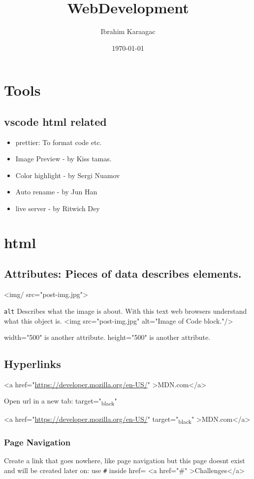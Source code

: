 \documentclass[11pt]{article}
\author{Ibrahim Karaagac}
\date{\today}
\title{WebDevelopment}
\begin{document}
\maketitle
\tableofcontents

\section{Tools}
\label{sec:org4ec48de}
\subsection{vscode html related}
\label{sec:org60915c2}
\begin{itemize}
\item prettier: To format code etc.
\item Image Preview - by Kiss tamas.
\item Color highlight - by Sergi Nuamov
\item Auto rename - by Jun Han
\item live server - by Ritwich Dey
\end{itemize}
\section{html}
\label{sec:orgb9d5238}
\subsection{Attributes: Pieces of data describes elements.}
\label{sec:org5366581}
<img/ src="post-img.jpg">

\texttt{alt} Describes what the image is about. With this text web browsers understand what this object is. 
<img src="post-img.jpg" alt="Image of Code block."/>

width="500" is another attribute.
height="500" is another attribute.
\subsection{Hyperlinks}
\label{sec:orgdbb3ada}
<a href="\url{https://developer.mozilla.org/en-US/}" >MDN.com</a>

Open url in a new tab:
target="\textsubscript{black}" 

<a href="\url{https://developer.mozilla.org/en-US/}" target="\textsubscript{black}" >MDN.com</a>
\subsubsection{Page Navigation}
\label{sec:orgcef7164}
Create a link that goes nowhere, like page navigation but this page doesnt exist and will be created later on: use \texttt{\#} inside href=
<a href="\#" >Challenges</a>
\end{document}
